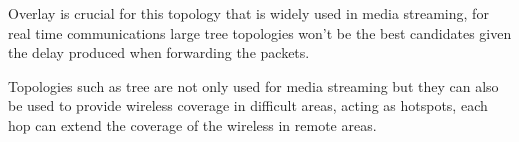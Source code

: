 Overlay is crucial for this topology that is widely used in media streaming, for real time communications large tree topologies won't be the best candidates given the delay produced when forwarding the packets.

Topologies such as tree are not only used for media streaming but they can also be used to provide wireless coverage in difficult areas, acting as hotspots, each hop can extend the coverage of the wireless in remote areas.


%
%
%

